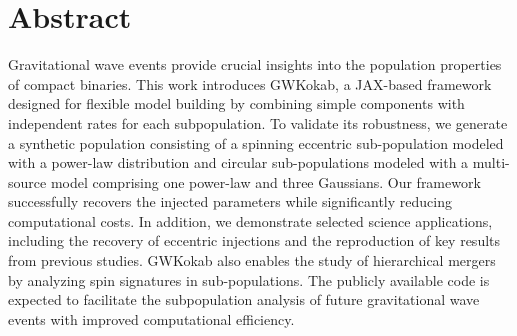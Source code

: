 \documentclass[a0,portrait]{a0poster}
\begin{document}
\section*{Abstract}

Gravitational wave events provide crucial insights into the population properties of compact binaries. This work introduces GWKokab, a JAX-based framework designed for flexible model building by combining simple components with independent rates for each subpopulation. To validate its robustness, we generate a synthetic population consisting of a spinning eccentric sub-population modeled with a power-law distribution and circular sub-populations modeled with a multi-source model comprising one power-law and three Gaussians. Our framework successfully recovers the injected parameters while significantly reducing computational costs. In addition, we demonstrate selected science applications, including the recovery of eccentric injections and the reproduction of key results from previous studies. GWKokab also enables the study of hierarchical mergers by analyzing spin signatures in sub-populations. The publicly available code is expected to facilitate the subpopulation analysis of future gravitational wave events with improved computational efficiency.
\end{document}
